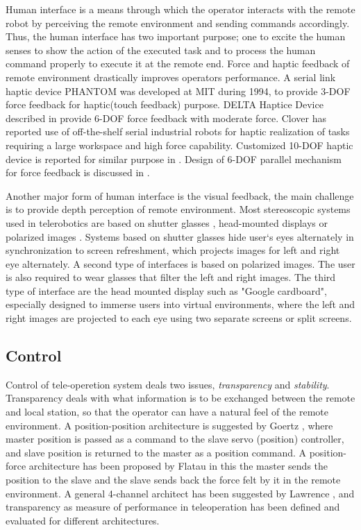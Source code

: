 Human interface is a means through which the operator interacts with the remote robot by perceiving the remote environment and sending commands accordingly. Thus, the human interface has two important purpose; one to excite the human senses to show the action of the executed task and to process the human command properly to execute it at the remote end.  Force and haptic feedback of remote environment drastically improves operators performance. A serial link haptic device PHANTOM \cite{massie1994phantom} was developed at MIT during 1994, to provide 3-DOF force feedback  for haptic(touch feedback) purpose. DELTA Haptice Device described in \cite{grange2001overview} provide 6-DOF force feedback with moderate force. Clover \cite{clover1997dynamic} has reported  use of off-the-shelf serial industrial robots for haptic realization of tasks requiring a large workspace and high force capability. Customized 10-DOF  haptic device is reported  for similar purpose in \cite{ueberle2004vishard10}. Design  of 6-DOF parallel mechanism for force feedback is discussed in \cite{yoon2001design}.

Another major form of human interface is the visual feedback, the main challenge is to provide depth perception of remote environment. Most stereoscopic systems used in telerobotics are based on shutter glasses \cite{aracil1997telerobotic,matthies1992stereo}, head-mounted displays \cite{matthies1992stereo} or polarized images \cite{hirzinger1994robots}. Systems based on shutter glasses hide user`s eyes alternately in synchronization to screen refreshment, which projects images for left and right eye alternately. A second type of interfaces is based on polarized images. The user is also required to wear glasses that filter the left and right images. The third type of interface are  the head mounted display such as "Google cardboard",  especially designed to immerse users into virtual environments, where the left and right images are projected to each eye using two separate screens or split screens.

\subsection{Control}
Control of tele-operetion system deals two issues, \textit{transparency} and \textit{stability}. Transparency deals with what information is to be exchanged between the remote and local station, so that the operator can have a natural feel of the remote environment. A position-position architecture is suggested by  Goertz \cite{goertz1961anl}, where  master position is passed as a command to the slave servo (position) controller, and slave position is returned to the master as a position command. A position-force architecture has been proposed by Flatau \cite{flatau1977sm} in this the master sends the position to the slave and the slave sends back the force felt by it in the remote environment. A general 4-channel architect has been suggested by Lawrence \cite{lawrence1993stability}, and transparency as  measure of performance in teleoperation has been defined and evaluated for different architectures.
 
